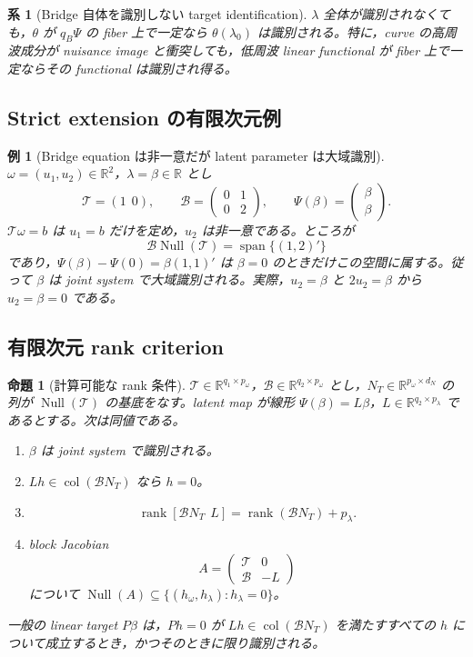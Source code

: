 \documentclass[11pt,a4paper]{ltjsarticle}
\newtheorem{proposition}{命題}[section]
\newtheorem{corollary}{系}[section]
\newtheorem{example}{例}[section]
\theoremstyle{remark}
\newcommand{\R}{\mathbb R}
\newcommand{\Top}{\mathscr T}
\newcommand{\Bop}{\mathscr B}
\newcommand{\Null}{\operatorname{Null}}
\newcommand{\rank}{\operatorname{rank}}
\newcommand{\Span}{\operatorname{span}}
\newcommand{\col}{\operatorname{col}}
\begin{document}
\begin{corollary}[Bridge 自体を識別しない target identification]\label{cor:targetonly}
$\lambda$ 全体が識別されなくても，$\theta$ が $q_B\Psi$ の fiber 上で一定なら $\theta(\lambda_0)$ は識別される。特に，curve の高周波成分が nuisance image と衝突しても，低周波 linear functional が fiber 上で一定ならその functional は識別され得る。
\end{corollary}

\subsection{Strict extension の有限次元例}
\begin{example}[Bridge equation は非一意だが latent parameter は大域識別]\label{ex:strictglobal}
$\omega=(u_1,u_2)\in\R^2$，$\lambda=\beta\in\R$ とし
\[
\Top=(1\ \ 0),\qquad
\Bop=\begin{pmatrix}0&1\\0&2\end{pmatrix},
\qquad
\Psi(\beta)=\begin{pmatrix}\beta\\\beta\end{pmatrix}.
\]
$\Top\omega=b$ は $u_1=b$ だけを定め，$u_2$ は非一意である。ところが
\[
\Bop\Null(\Top)=\Span\{(1,2)'\}
\]
であり，$\Psi(\beta)-\Psi(0)=\beta(1,1)'$ は $\beta=0$ のときだけこの空間に属する。従って $\beta$ は joint system で大域識別される。実際，$u_2=\beta$ と $2u_2=\beta$ から $u_2=\beta=0$ である。
\end{example}

\subsection{有限次元 rank criterion}
\begin{proposition}[計算可能な rank 条件]\label{prop:rankglobal}
$\Top\in\R^{q_1\times p_\omega}$，$\Bop\in\R^{q_2\times p_\omega}$ とし，$N_T\in\R^{p_\omega\times d_N}$ の列が $\Null(\Top)$ の基底をなす。latent map が線形 $\Psi(\beta)=L\beta$，$L\in\R^{q_2\times p_\lambda}$ であるとする。次は同値である。
\begin{enumerate}[label=(\roman*)]
\item $\beta$ は joint system で識別される。
\item $Lh\in\col(\Bop N_T)$ なら $h=0$。
\item
\begin{equation}
\rank[\Bop N_T\ \ L]
=\rank(\Bop N_T)+p_\lambda.
\label{eq:rankcriterion}
\end{equation}
\item block Jacobian
\[
A=\begin{pmatrix}\Top&0\\\Bop&-L\end{pmatrix}
\]
について $\Null(A)\subseteq\{(h_\omega,h_\lambda):h_\lambda=0\}$。
\end{enumerate}
一般の linear target $P\beta$ は，$P h=0$ が $Lh\in\col(\Bop N_T)$ を満たすすべての $h$ について成立するとき，かつそのときに限り識別される。
\end{proposition}
\end{document}
